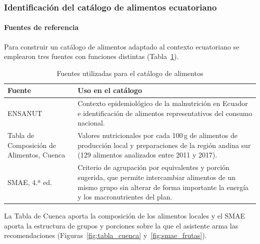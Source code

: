\subsubsection{Identificación del catálogo de alimentos ecuatoriano}

\paragraph{Fuentes de referencia}

Para construir un catálogo de alimentos adaptado al contexto ecuatoriano se
emplearon tres fuentes con funciones distintas (Tabla~\ref{tab:fuentes}).

\begin{table}[H]
\centering\small
\caption{Fuentes utilizadas para el catálogo de alimentos}\label{tab:fuentes}
\begin{tabularx}{\linewidth}{|p{4.2cm}|X|}
\hline
\textbf{Fuente} & \textbf{Uso en el catálogo} \\ \hline
ENSANUT~\cite{msp_ensanut} & Contexto epidemiológico de la malnutrición en Ecuador e identificación de alimentos representativos del consumo nacional. \\ \hline
Tabla de Composición de Alimentos, Cuenca~\cite{ortiz2018tabla} & Valores nutricionales por cada 100\,g de alimentos de producción local y preparaciones de la región andina sur (129 alimentos analizados entre 2011 y 2017). \\ \hline
SMAE, 4.ª ed.~\cite{perez2014smae} & Criterio de agrupación por equivalentes y porción sugerida, que permite intercambiar alimentos de un mismo grupo sin alterar de forma importante la energía y los macronutrientes del plan. \\ \hline
\end{tabularx}
\end{table}

La Tabla de Cuenca aporta la composición de los alimentos locales y el SMAE
aporta la estructura de grupos y porciones sobre la que el asistente arma las
recomendaciones (Figuras~\ref{fig:tabla_cuenca} y~\ref{fig:smae_frutas}).


